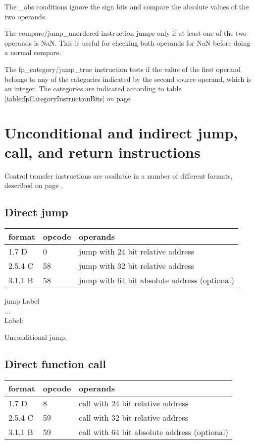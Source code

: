 \documentclass[forwardcom.tex]{subfiles}
\begin{document}
The \_abs conditions ignore the sign bits and compare the absolute values of the two operands.
\vv

The compare/jump\_unordered instruction jumps only if at least one of the two operands is NaN. This is useful for checking both operands for NaN before doing a normal compare.
\vv

The fp\_category/jump\_true instruction tests if the value of the first operand belongs to any of the categories indicated by the second source operand, which is an integer. The categories are indicated according to table \ref{table:fpCategoryInstructionBits} on page \pageref{table:fpCategoryInstructionBits}
\vv


\section{Unconditional and indirect jump, call, and return instructions}
Control transfer instructions are available in a number of different formats, described on 
page \pageref{table:jumpInstructionFormats}.


\subsection{Direct jump}
\label{table:jumpInstruction}
\begin{tabular}{|p{14mm}|p{12mm}|p{110mm}|}
\hline
\bfseries format & \bfseries opcode & \bfseries operands \\ \hline
1.7 D &  0 & jump with 24 bit relative address \\ \hline
2.5.4 C & 58 & jump with 32 bit relative address \\ \hline
3.1.1 B & 58 & jump with 64 bit absolute address (optional) \\ \hline
\end{tabular}
\vv

jump Label \\
... \\
Label:
\vv

Unconditional jump.
\vv

\subsection{Direct function call}
\label{table:callInstruction}
\begin{tabular}{|p{14mm}|p{12mm}|p{110mm}|}
\hline
\bfseries format & \bfseries opcode & \bfseries operands \\ \hline
1.7 D &  8 & call with 24 bit relative address \\ \hline
2.5.4 C & 59 & call with 32 bit relative address \\ \hline
3.1.1 B & 59 & call with 64 bit absolute address (optional) \\ \hline
\end{tabular}
\vv
\end{document}
